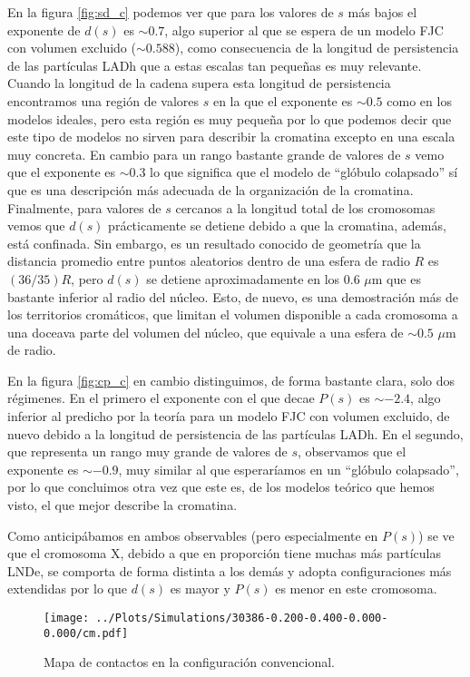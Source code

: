 En la figura \ref{fig:sd_c} podemos ver que para los valores de $s$ más bajos el exponente de $d(s)$ es $\sim0.7$, algo superior al que se espera de un modelo FJC con volumen excluido ($\sim0.588$), como consecuencia de la longitud de persistencia de las partículas LADh que a estas escalas tan pequeñas es muy relevante. Cuando la longitud de la cadena supera esta longitud de persistencia encontramos una región de valores $s$ en la que el exponente es $\sim0.5$ como en los modelos ideales, pero esta región es muy pequeña por lo que podemos decir que este tipo de modelos no sirven para describir la cromatina excepto en una escala muy concreta. En cambio para un rango bastante grande de valores de $s$ vemo que el exponente es $\sim0.3$ lo que significa que el modelo de ``glóbulo colapsado'' sí que es una descripción más adecuada de la organización de la cromatina. Finalmente, para valores de $s$ cercanos a la longitud total de los cromosomas vemos que $d(s)$ prácticamente se detiene debido a que la cromatina, además, está confinada. Sin embargo, es un resultado conocido de geometría que la distancia promedio entre puntos aleatorios dentro de una esfera de radio $R$ es $(36/35)R$, pero $d(s)$ se detiene aproximadamente en los $0.6$ $\mu$m que es bastante inferior al radio del núcleo. Esto, de nuevo, es una demostración más de los territorios cromáticos, que limitan el volumen disponible a cada cromosoma a una doceava parte del volumen del núcleo, que equivale a una esfera de $\sim0.5$ $\mu$m de radio.

En la figura \ref{fig:cp_c} en cambio distinguimos, de forma bastante clara, solo dos régimenes. En el primero el exponente con el que decae $P(s)$ es $\sim-2.4$, algo inferior al predicho por la teoría para un modelo FJC con volumen excluido, de nuevo debido a la longitud de persistencia de las partículas LADh. En el segundo, que representa un rango muy grande de valores de $s$, observamos que el exponente es $\sim-0.9$, muy similar al que esperaríamos en un ``glóbulo colapsado'', por lo que concluimos otra vez que este es, de los modelos teórico que hemos visto, el que mejor describe la cromatina.

Como anticipábamos en ambos observables (pero especialmente en $P(s)$) se ve que el cromosoma X, debido a que en proporción tiene muchas más partículas LNDe, se comporta de forma distinta a los demás y adopta configuraciones más extendidas por lo que $d(s)$ es mayor y $P(s)$ es menor en este cromosoma.

\begin{figure}
    \centering
    \texttt{[image: ../Plots/Simulations/30386-0.200-0.400-0.000-0.000/cm.pdf]}
    \caption{Mapa de contactos en la configuración convencional.}
    \label{fig:cm_c}
\end{figure}

